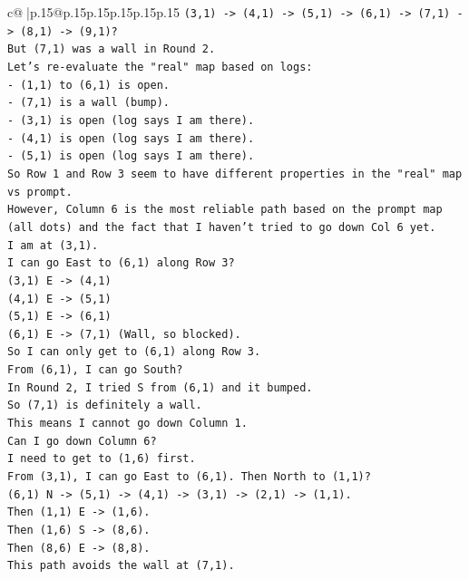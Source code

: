 \documentclass{article}
\begin{document}
{\begin{supertabular}{c@{$\;$}|p{.15\linewidth}@{}p{.15\linewidth}p{.15\linewidth}p{.15\linewidth}p{.15\linewidth}p{.15\linewidth}}
{{{\texttt{(3,1) {-}> (4,1) {-}> (5,1) {-}> (6,1) {-}> (7,1) {-}> (8,1) {-}> (9,1)?} \\
\texttt{But (7,1) was a wall in Round 2.} \\
\texttt{Let's re{-}evaluate the "real" map based on logs:} \\
\texttt{{-} (1,1) to (6,1) is open.} \\
\texttt{{-} (7,1) is a wall (bump).} \\
\texttt{{-} (3,1) is open (log says I am there).} \\
\texttt{{-} (4,1) is open (log says I am there).} \\
\texttt{{-} (5,1) is open (log says I am there).} \\
\texttt{So Row 1 and Row 3 seem to have different properties in the "real" map vs prompt.} \\
\texttt{However, Column 6 is the most reliable path based on the prompt map (all dots) and the fact that I haven't tried to go down Col 6 yet.} \\
\texttt{I am at (3,1).} \\
\texttt{I can go East to (6,1) along Row 3?} \\
\texttt{(3,1) E {-}> (4,1)} \\
\texttt{(4,1) E {-}> (5,1)} \\
\texttt{(5,1) E {-}> (6,1)} \\
\texttt{(6,1) E {-}> (7,1) (Wall, so blocked).} \\
\texttt{So I can only get to (6,1) along Row 3.} \\
\texttt{From (6,1), I can go South?} \\
\texttt{In Round 2, I tried S from (6,1) and it bumped.} \\
\texttt{So (7,1) is definitely a wall.} \\
\texttt{This means I cannot go down Column 1.} \\
\texttt{Can I go down Column 6?} \\
\texttt{I need to get to (1,6) first.} \\
\texttt{From (3,1), I can go East to (6,1). Then North to (1,1)?} \\
\texttt{(6,1) N {-}> (5,1) {-}> (4,1) {-}> (3,1) {-}> (2,1) {-}> (1,1).} \\
\texttt{Then (1,1) E {-}> (1,6).} \\
\texttt{Then (1,6) S {-}> (8,6).} \\
\texttt{Then (8,6) E {-}> (8,8).} \\
\texttt{This path avoids the wall at (7,1).} \\
}}}
\end{supertabular}}
\end{document}

